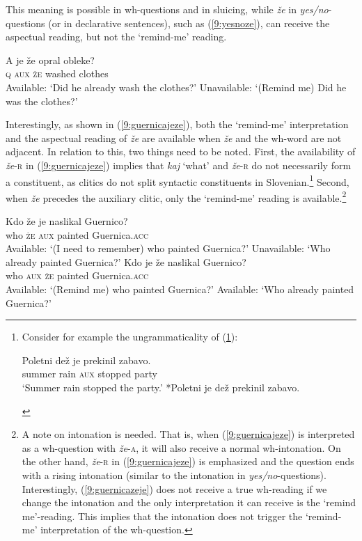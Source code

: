 \documentclass[output=paper,modfonts,newtxmath,hidelinks]{langscibook}
\begin{document}
\noindent This meaning is possible in wh-questions and in sluicing, while \textit{že} in \textit{yes/no}-questions (or in declarative sentences), such as (\ref{9:yesnoze}), can receive the aspectual reading, but not the `remind-me' reading. 

\begin{exe}
\ex \label{9:yesnoze}
\gll A je že opral obleke?\\
	\textsc{q} \textsc{aux} \textsc{že} washed clothes\\
	\glt Available: `Did he already wash the clothes?'
\glt Unavailable: `(Remind me) Did he was the clothes?'
\end{exe}

\noindent Interestingly, as shown in (\ref{9:guernicajeze}), both the `remind-me' interpretation and the aspectual reading of \textit{že} are available when \textit{že} and the wh-word are not adjacent. In relation to this, two things need to be noted. First, the availability of \textit{že}-\textsc{r} in (\ref{9:guernicajeze}) implies that \textit{kaj} `what' and \textit{že}-\textsc{r} do not necessarily form a constituent, as clitics do not split syntactic constituents in Slovenian.\footnote{Consider for example the ungrammaticality of (\ref{9:ib}):
\ea
\begin{xlista}
\ex
{
\gll	Poletni dež je prekinil zabavo.\\
 summer rain \textsc{aux} stopped party\\
\trans `Summer rain stopped the party.' 
}
\ex
{
 *Poletni je dež prekinil zabavo.
}
\label{9:ib}
\end{xlista}
\zlast} 
Second, when \textit{že} precedes the auxiliary clitic, only the `remind-me' reading is available.\footnote{A note on intonation is needed. That is, when (\ref{9:guernicajeze}) is interpreted as a wh-question with \textit{že}-\textsc{a}, it will also receive a normal wh-intonation. On the other hand, \textit{že}-\textsc{r} in (\ref{9:guernicajeze}) is emphasized and the question ends with a rising intonation (similar to the intonation in \textit{yes/no}-questions). Interestingly, (\ref{9:guernicazeje}) does not receive a true wh-reading if we change the intonation and the only interpretation it can receive is the `remind me'-reading. This implies that the intonation does not trigger the `remind-me' interpretation of the wh-question.} 

\begin{exe}
\ex 
\begin{xlist}
\ex \label{9:guernicazeje}
\gll Kdo že je naslikal Guernico? \\
		who \textsc{že} \textsc{aux} painted Guernica.\textsc{acc}\\
\trans  Available: `(I need to remember) who painted Guernica?'
\trans Unavailable: `Who already painted Guernica?'
\ex \label{9:guernicajeze}
\gll	Kdo je že naslikal Guernico?\\
		who \textsc{aux} \textsc{že} painted Guernica.\textsc{acc}\\
\trans	 Available: `(Remind me) who painted Guernica?'
\trans 	 Available: `Who already painted Guernica?'
\end{xlist}
\end{exe}
\end{document}
